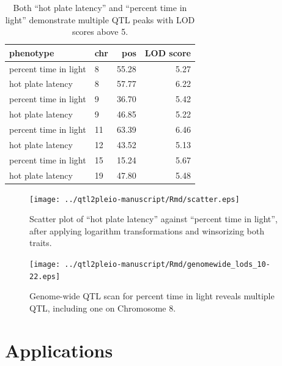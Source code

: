 \documentclass[oneside]{book}\usepackage[]{graphicx}\usepackage[]{color}
\begin{document}
\newpage

\begin{table}
\caption{Both ``hot plate latency'' and ``percent time in light''
  demonstrate multiple QTL peaks with LOD scores above 5.}
  \label{table-peaks}
\begin{center}
\begin{tabular}{l|lrr}
  \hline
phenotype & chr & pos & LOD score \\
   \hline
percent time in light & 8 & 55.28 & 5.27 \\
 hot plate latency & 8 & 57.77 & 6.22 \\
 percent time in light & 9 & 36.70 & 5.42 \\
 hot plate latency & 9 & 46.85 & 5.22 \\
 percent time in light & 11 & 63.39 & 6.46 \\
 hot plate latency & 12 & 43.52 & 5.13 \\
 percent time in light & 15 & 15.24 & 5.67 \\
 hot plate latency & 19 & 47.80 & 5.48 \\
   \hline
\end{tabular}
\end{center}
\end{table}







\clearpage



\begin{figure}
\texttt{[image: ../qtl2pleio-manuscript/Rmd/scatter.eps]}
\caption{Scatter plot of ``hot plate latency'' against ``percent time in
  light'', after applying logarithm transformations and winsorizing
  both traits.}
\label{fig:scatter}
\end{figure}


\begin{figure}
\texttt{[image: ../qtl2pleio-manuscript/Rmd/genomewide\_lods\_10-22.eps]}
\caption{Genome-wide QTL scan for percent time in light reveals
  multiple QTL, including one on Chromosome 8.}
\label{fig:genomewide10-22}
\end{figure}






\chapter{Applications}\label{sec:applications}
\end{document}
